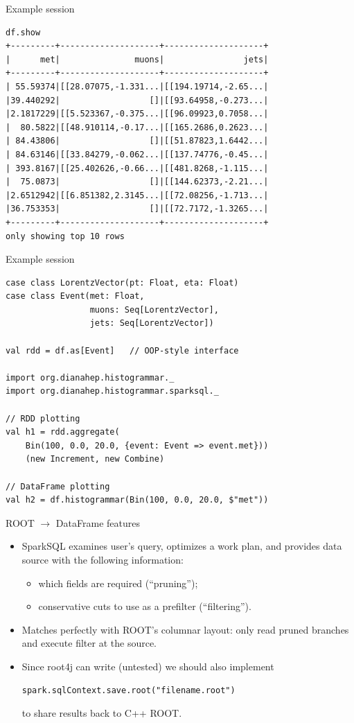 \documentclass{beamer}
\begin{document}
\begin{frame}[fragile]{Example session}
\small
\begin{verbatim}
df.show
+---------+--------------------+--------------------+
|      met|               muons|                jets|
+---------+--------------------+--------------------+
| 55.59374|[[28.07075,-1.331...|[[194.19714,-2.65...|
|39.440292|                  []|[[93.64958,-0.273...|
|2.1817229|[[5.523367,-0.375...|[[96.09923,0.7058...|
|  80.5822|[[48.910114,-0.17...|[[165.2686,0.2623...|
| 84.43806|                  []|[[51.87823,1.6442...|
| 84.63146|[[33.84279,-0.062...|[[137.74776,-0.45...|
| 393.8167|[[25.402626,-0.66...|[[481.8268,-1.115...|
|  75.0873|                  []|[[144.62373,-2.21...|
|2.6512942|[[6.851382,2.3145...|[[72.08256,-1.713...|
|36.753353|                  []|[[72.7172,-1.3265...|
+---------+--------------------+--------------------+
only showing top 10 rows
\end{verbatim}
\end{frame}

\begin{frame}[fragile]{Example session}
\small
\begin{verbatim}
case class LorentzVector(pt: Float, eta: Float)
case class Event(met: Float,
                 muons: Seq[LorentzVector],
                 jets: Seq[LorentzVector])

val rdd = df.as[Event]   // OOP-style interface

import org.dianahep.histogrammar._
import org.dianahep.histogrammar.sparksql._

// RDD plotting
val h1 = rdd.aggregate(
    Bin(100, 0.0, 20.0, {event: Event => event.met}))
    (new Increment, new Combine)

// DataFrame plotting
val h2 = df.histogrammar(Bin(100, 0.0, 20.0, $"met"))
\end{verbatim}
\end{frame}

\begin{frame}[fragile]{ROOT $\to$ DataFrame features}
\begin{itemize}\setlength{\itemsep}{0.25 cm}
\item SparkSQL examines user's query, optimizes a work plan, and provides data source with the following information:
\begin{itemize}
\item which fields are required (``pruning'');
\item conservative cuts to use as a prefilter (``filtering'').
\end{itemize}

\item Matches perfectly with ROOT's columnar layout: only read pruned branches and execute filter at the source.

\item Since root4j can write (untested) we should also implement 
\begin{verbatim}spark.sqlContext.save.root("filename.root")
\end{verbatim}
to share results back to C++ ROOT.
\end{itemize}
\end{frame}
\end{document}
